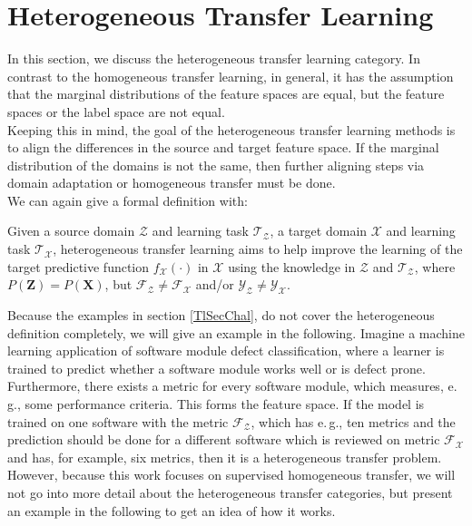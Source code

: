 \section{Heterogeneous Transfer Learning}\label{TlSecHetero}
In this section, we discuss the heterogeneous transfer learning category.
In contrast to the homogeneous transfer learning, in general, it has the assumption that the marginal distributions of the feature spaces are equal, but the feature spaces or the label space are not equal.\cite[p. 4]{Weiss.2016}\\
Keeping this in mind, the goal of the heterogeneous transfer learning methods is to align the differences in the source and target feature space.
If the marginal distribution of the domains is not the same, then further aligning steps via domain adaptation or homogeneous transfer must be done.
\cite[p. 6]{Weiss.2016}\\
We can again give a formal definition with:
\begin{mDef}
	Given a source domain $\mathcal{Z}$ and learning task $\mathcal{T_Z}$, a target domain $\mathcal{X}$ and learning task $\mathcal{T_X}$, heterogeneous transfer learning aims to help improve the learning of the target predictive function $f_\mathcal{X}(\cdot)$ in $\mathcal{X}$ using the knowledge in $\mathcal{Z}$ and $\mathcal{T_Z}$, where $P(\mathbf{Z}) = P(\mathbf{X})$, but $\mathcal{F_Z} \neq \mathcal{F_X}$ and/or $\mathcal{Y_Z} \neq \mathcal{Y_X} $.\cite[p. 4]{Weiss.2016}
\end{mDef}
Because the examples in section \ref{TlSecChal}, do not cover the heterogeneous definition completely, we will give an example in the following.
Imagine a machine learning application of software module defect classification, where a learner is trained to predict whether a software module works well or is defect prone.
Furthermore, there exists a metric for every software module, which measures, e.\,g., some performance criteria.
This forms the feature space.
If the model is trained on one software with the metric $\mathcal{F_Z}$, which has e.\,g., ten metrics and the prediction should be done for a different software which is reviewed on metric $\mathcal{F_X}$ and has, for example, six metrics, then it is a heterogeneous transfer problem.\cite[p 3-4]{Weiss.2016}\\
However, because this work focuses on supervised homogeneous transfer, we will not go into more detail about the heterogeneous transfer categories, but present an example in the following to get an idea of how it works.\\
